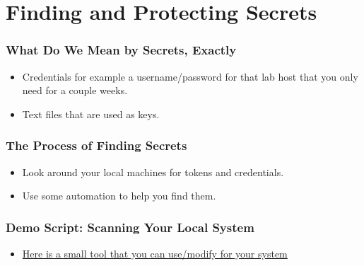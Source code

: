 \documentclass[aspectratio=169]{beamer}
\makeatletter
\def\sectionsubtitle#1{\gdef\@sectionsubtitle{#1}}
\gdef\@sectionsubtitle{}
\makeatother
\begin{document}
\sectionsubtitle{What is it you want to protect?}
\section{Finding and Protecting Secrets}

{
\begin{frame}
	\frametitle{What Do We Mean by Secrets, Exactly}
	\begin{itemize}
		\item Credentials for example a username/password for that lab host that you only need for a couple weeks.
		\item Text files that are used as keys.
	\end{itemize}


\end{frame}
}

{
\begin{frame}
	\frametitle{The Process of Finding Secrets}
	\begin{itemize}
		\item Look around your local machines for tokens and credentials.
		\item Use some automation to help you find them.
	\end{itemize}
\end{frame}
}

\begin{frame}
	\frametitle{Demo Script: Scanning Your Local System}
	\begin{itemize}
        \item\href{ https://github.com/devsecfranklin/stash-house/tree/main/demo/01_scanner}{Here is a small tool that you can use/modify for your system}
	\end{itemize}
\end{frame}
\end{document}
